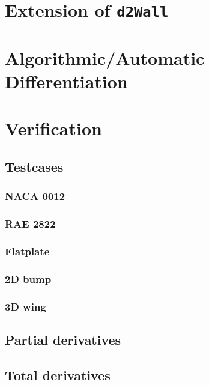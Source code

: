 \section{Extension of \texttt{d2Wall}}

\section{Algorithmic/Automatic Differentiation}

\section{Verification}

\subsection{Testcases}

\subsubsection{NACA 0012}
\subsubsection{RAE 2822}
\subsubsection{Flatplate}
\subsubsection{2D bump}
\subsubsection{3D wing}


\subsection{Partial derivatives}

\subsection{Total derivatives}


